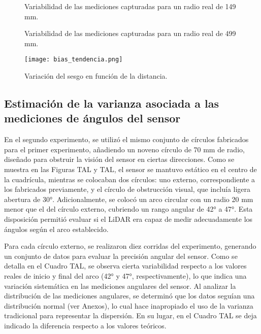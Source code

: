 \begin{figure}[H]
	\centering
	\caption{Variabilidad de las mediciones capturadas para un radio real de 149 mm.}
	\label{fig:lecturas1}
\end{figure}

\begin{figure}[H]
	\centering
	\caption{Variabilidad de las mediciones capturadas para un radio real de 499 mm.}
	\label{fig:lecturas2}
\end{figure}

\begin{figure}[H]
	\centering
	\texttt{[image: bias\_tendencia.png]}
	\caption{Variación del sesgo en función de la distancia.}
	\label{fig:bias_tendencia}
\end{figure}

\subsection{Estimación de la varianza asociada a las mediciones de ángulos del sensor}
En el segundo experimento, se utilizó el mismo conjunto de círculos fabricados para el primer experimento, añadiendo un noveno círculo de 70 mm de radio, diseñado para obstruir la visión del sensor en ciertas direcciones. Como se muestra en las Figuras TAL y TAL, el sensor se mantuvo estático en el centro de la cuadrícula, mientras se colocaban dos círculos: uno externo, correspondiente a los fabricados previamente, y el círculo de obstrucción visual, que incluía ligera abertura de 30°. Adicionalmente, se colocó un arco circular con un radio 20 mm menor que el del círculo externo, cubriendo un rango angular de 42° a 47°. Esta disposición permitió evaluar si el LiDAR era capaz de medir adecuadamente los ángulos según el arco establecido. 

Para cada círculo externo, se realizaron diez corridas del experimento, generando un conjunto de datos para evaluar la precisión angular del sensor. Como se detalla en el Cuadro TAL, se observa cierta variabilidad respecto a los valores reales de inicio y final del arco (42° y 47°, respectivamente), lo que indica una variación sistemática en las mediciones angulares del sensor. Al analizar la distribución de las mediciones angulares, se determinó que los datos seguían una distribución normal (ver Anexos), lo cual hace inapropiado el uso de la varianza tradicional para representar la dispersión. En su lugar, en el Cuadro TAL se deja indicado la diferencia respecto a los valores teóricos.

